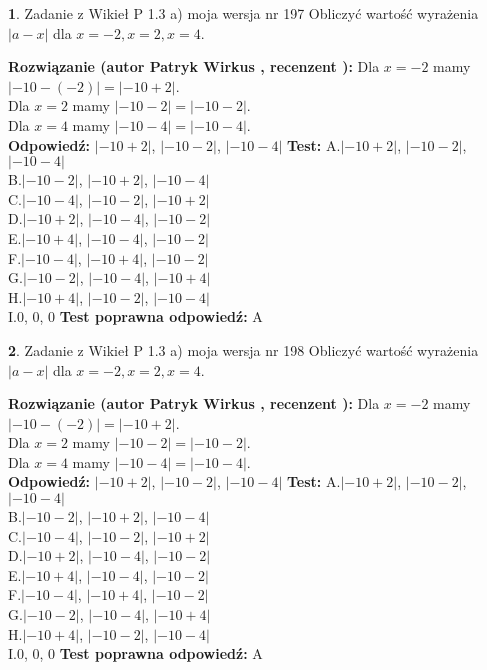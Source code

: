 \documentclass[12pt, a4paper]{article}
\theoremstyle{definition} %
\newtheorem{zad}{}
\newcommand{\zadStart}[1]{\begin{zad}#1\newline}
\newcommand{\zadStop}{\end{zad}}
\newcommand{\rozwStart}[2]{\noindent \textbf{Rozwiązanie (autor #1 , recenzent #2): }\newline}
\newcommand{\rozwStop}{\newline}
\newcommand{\odpStart}{\noindent \textbf{Odpowiedź:}\newline}
\newcommand{\odpStop}{\newline}
\newcommand{\testStart}{\noindent \textbf{Test:}\newline}
\newcommand{\testStop}{\newline}
\newcommand{\kluczStart}{\noindent \textbf{Test poprawna odpowiedź:}\newline}
\newcommand{\kluczStop}{\newline}
\begin{document}
\zadStart{Zadanie z Wikieł P 1.3 a) moja wersja nr 197}
Obliczyć wartość wyrażenia $|a - x|$ dla $x=-2,x=2,x=4$.
\zadStop
\rozwStart{Patryk Wirkus}{}
Dla $x = -2$ mamy $|-10 - (-2)| = |-10 + 2|$.\\
Dla $x = 2$ mamy $|-10 - 2| = |-10 - 2|$.\\
Dla $x = 4$ mamy $|-10 - 4| = |-10 - 4|$.\\
\rozwStop
\odpStart
$|-10 + 2|$, $|-10 - 2|$, $|-10 - 4|$
\odpStop
\testStart
A.$|-10 + 2|$, $|-10 - 2|$, $|-10 - 4|$\\
B.$|-10 - 2|$, $|-10 + 2|$, $|-10 - 4|$\\
C.$|-10 - 4|$, $|-10 - 2|$, $|-10 + 2|$\\
D.$|-10 + 2|$, $|-10 - 4|$, $|-10 - 2|$\\
E.$|-10 + 4|$, $|-10 - 4|$, $|-10 - 2|$\\
F.$|-10 - 4|$, $|-10 + 4|$, $|-10 - 2|$\\
G.$|-10 - 2|$, $|-10 - 4|$, $|-10 + 4|$\\
H.$|-10 + 4|$, $|-10 - 2|$, $|-10 - 4|$\\
I.$0$, $0$, $0$
\testStop
\kluczStart
A
\kluczStop



\zadStart{Zadanie z Wikieł P 1.3 a) moja wersja nr 198}
Obliczyć wartość wyrażenia $|a - x|$ dla $x=-2,x=2,x=4$.
\zadStop
\rozwStart{Patryk Wirkus}{}
Dla $x = -2$ mamy $|-10 - (-2)| = |-10 + 2|$.\\
Dla $x = 2$ mamy $|-10 - 2| = |-10 - 2|$.\\
Dla $x = 4$ mamy $|-10 - 4| = |-10 - 4|$.\\
\rozwStop
\odpStart
$|-10 + 2|$, $|-10 - 2|$, $|-10 - 4|$
\odpStop
\testStart
A.$|-10 + 2|$, $|-10 - 2|$, $|-10 - 4|$\\
B.$|-10 - 2|$, $|-10 + 2|$, $|-10 - 4|$\\
C.$|-10 - 4|$, $|-10 - 2|$, $|-10 + 2|$\\
D.$|-10 + 2|$, $|-10 - 4|$, $|-10 - 2|$\\
E.$|-10 + 4|$, $|-10 - 4|$, $|-10 - 2|$\\
F.$|-10 - 4|$, $|-10 + 4|$, $|-10 - 2|$\\
G.$|-10 - 2|$, $|-10 - 4|$, $|-10 + 4|$\\
H.$|-10 + 4|$, $|-10 - 2|$, $|-10 - 4|$\\
I.$0$, $0$, $0$
\testStop
\kluczStart
A
\kluczStop
\end{document}
